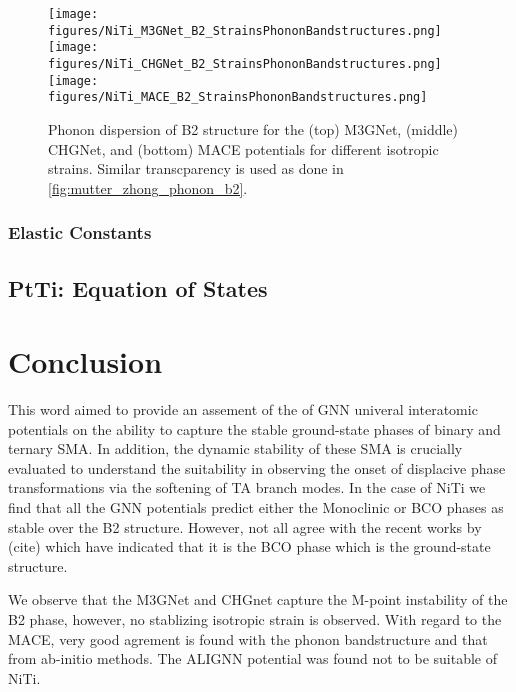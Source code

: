 \documentclass[preprint,colorlinks=true,linkcolor=black,citecolor=black]{elsarticle}
\begin{document}
\begin{figure}[!htp]
	\begin{centering}
		\texttt{[image: figures/NiTi\_M3GNet\_B2\_StrainsPhononBandstructures.png]} \vspace{1mm}
		\texttt{[image: figures/NiTi\_CHGNet\_B2\_StrainsPhononBandstructures.png]} \vspace{1mm}
		\texttt{[image: figures/NiTi\_MACE\_B2\_StrainsPhononBandstructures.png]}
		\caption{ Phonon dispersion of B2 structure for the (top) M3GNet,
			(middle) CHGNet, and (bottom) MACE potentials for different
			isotropic strains. Similar transcparency is used as done in
			\ref{fig:mutter_zhong_phonon_b2}.  }
		\label{fig:gnn_phonon_b2}
	\end{centering}
\end{figure}


\subsubsection{Elastic Constants}


\subsection{PtTi: Equation of States}
\label{sec:ptti_eos}

\section{Conclusion}
\label{sec:conclusion}
This word aimed to provide an assement of the of GNN univeral
interatomic potentials on the ability to capture the stable
ground-state phases of binary and ternary SMA. In addition, the
dynamic stability of these SMA is crucially evaluated to understand
the suitability in observing the onset of displacive phase
transformations via the softening of TA branch modes. In the case of
NiTi we find that all the GNN potentials predict either the Monoclinic
or BCO phases as stable over the B2 structure. However, not all agree
with the recent works by (cite) which have indicated that it is the
BCO phase which is the ground-state structure.

We observe that the M3GNet and CHGnet capture the M-point instability
of the B2 phase, however, no stablizing isotropic strain is
observed. With regard to the MACE, very good agrement is found with
the phonon bandstructure and that from ab-initio methods. The ALIGNN
potential was found not to be suitable of NiTi.
\end{document}
